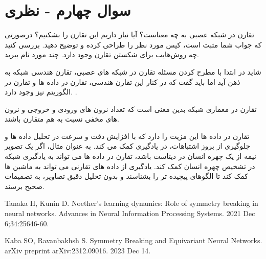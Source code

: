 \section{سوال چهارم - نظری}

تقارن در شبکه عصبی به چه معناست؟ آیا نیاز داریم این تقارن را بشکنیم؟ درصورتی که جواب شما مثبت است، کیس مورد نظر را طراحی کرده و توضیح دهید. بررسی کنید چه روش‌هایب برای شکستن تقارن وجود دارد. چند مورد نام ببرید.





\begin{qsolve}
 	شاید در ابتدا با مطرح کردن مسئله تقارن در شبکه های عصبی، تقارن هندسی شبکه به ذهن آید اما باید گفت که در کنار این تقارن هندسی، تقارن در داده ها و تقارن در الگوریتم نیز وجود دارد. \cite{ref1}.
 	
 	تقارن در معماری شبکه بدین معنی است که تعداد نرون های ورودی و خروجی و نرون های مخفی نسبت به هم متقارن باشند.
 	
 	تقارن در داده ها این مزیت را دارد که با افزایش دقت و سرعت در تحلیل داده ها و جلوگیری از بروز اشتباهات، در یادگیری کمک می کند. به عنوان مثال، اگر یک تصویر نیمه از یک چهره انسان در دیتاست باشد، تقارن در داده ها می تواند به یادگیری شبکه در تشخیص چهره انسان کمک کند. یادگیری از داده های تقارنی می تواند به ماشین ها کمک کند تا الگوهای پیچیده تر را بشناسند و بدون تحلیل دقیق تصاویر، به تصمیمات صحیح برسند.



\end{qsolve}

















\begin{latin}
	\begin{thebibliography}{9}
		Tanaka H, Kunin D. Noether’s learning dynamics: Role of symmetry breaking in neural networks. Advances in Neural Information Processing Systems. 2021 Dec 6;34:25646-60.
		
		Kaba SO, Ravanbakhsh S. Symmetry Breaking and Equivariant Neural Networks. arXiv preprint arXiv:2312.09016. 2023 Dec 14.
	\end{thebibliography} 
\end{latin}